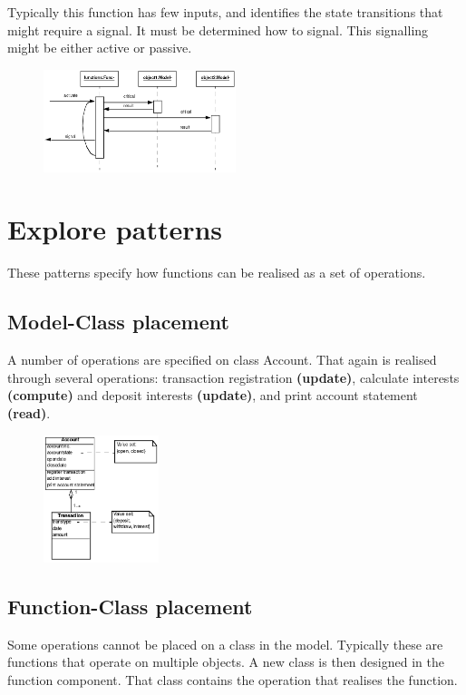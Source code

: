 Typically this function has few inputs, and identifies the state transitions that might require a signal. It must be determined how to signal. This signalling might be either active or passive.


\begin{figure}[H]
    \centering
    \includegraphics[width=0.5\textwidth]{figures/functioncomponentsignal.png}
\end{figure}

\section{Explore patterns}
These patterns specify how functions can be realised as a set of operations.

\subsection{Model-Class placement}
A number of operations are specified on class Account. That again is realised through several operations: transaction registration \textbf{(update)}, calculate interests \textbf{(compute)} and deposit interests \textbf{(update)}, and print account statement \textbf{(read)}.

\begin{figure}[H]
    \centering
    \includegraphics[width=0.3\textwidth]{figures/patternmodelclass.png}
\end{figure}

\subsection{Function-Class placement}
Some operations cannot be placed on a class in the model. Typically these are functions that operate on multiple objects. A new class is then designed in the function component. That class contains the operation that realises the function.


